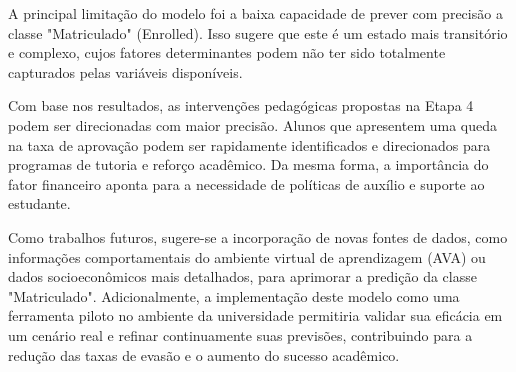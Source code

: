 \documentclass[12pt]{article}
\begin{document}
A principal limitação do modelo foi a baixa capacidade de prever com precisão a classe "Matriculado" (Enrolled). Isso sugere que este é um estado mais transitório e complexo, cujos fatores determinantes podem não ter sido totalmente capturados pelas variáveis disponíveis.

Com base nos resultados, as intervenções pedagógicas propostas na Etapa 4 podem ser direcionadas com maior precisão. Alunos que apresentem uma queda na taxa de aprovação podem ser rapidamente identificados e direcionados para programas de tutoria e reforço acadêmico. Da mesma forma, a importância do fator financeiro aponta para a necessidade de políticas de auxílio e suporte ao estudante.

Como trabalhos futuros, sugere-se a incorporação de novas fontes de dados, como informações comportamentais do ambiente virtual de aprendizagem (AVA) ou dados socioeconômicos mais detalhados, para aprimorar a predição da classe "Matriculado". Adicionalmente, a implementação deste modelo como uma ferramenta piloto no ambiente da universidade permitiria validar sua eficácia em um cenário real e refinar continuamente suas previsões, contribuindo para a redução das taxas de evasão e o aumento do sucesso acadêmico.
\renewcommand{\refname}{Referências}


\end{document}

